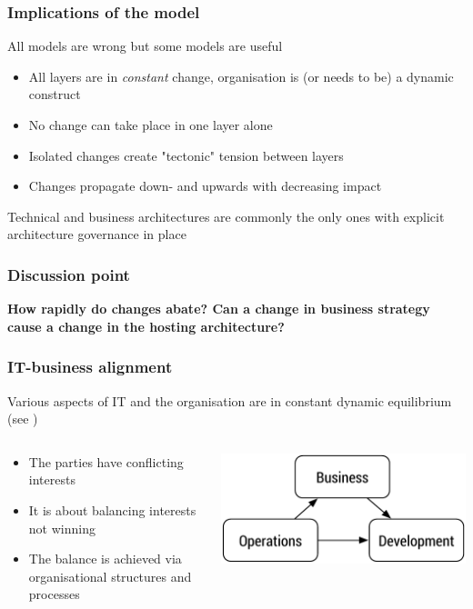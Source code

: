 \begin{frame}[fragile]
  \frametitle{Implications of the model}
  All models are wrong but some models are useful \citep{box1976science}
	\begin{itemize}
		\item All layers are in \emph{constant} change, organisation is (or needs to be) a dynamic construct
		\item No change can take place in one layer alone
		\item Isolated changes create "tectonic" tension between layers
		\item Changes propagate down- and upwards with decreasing impact
	\end{itemize}
	Technical and business architectures are commonly the only ones with explicit architecture governance in place
\end{frame}


\begin{frame}[fragile]
  \frametitle{Discussion point}
		\begin{center}
			\textbf{How rapidly do changes abate? Can a change in business strategy cause a change in the hosting architecture?}
		\end{center}
\end{frame}

\begin{frame}[fragile]
  \frametitle{IT-business alignment}
  Various aspects of IT and the organisation are in constant dynamic equilibrium (see \cite{luftman2004assessing})
	\begin{columns}[T]
		\begin{column}{7cm}
			\begin{itemize}
				\item The parties have conflicting interests
				\item It is about balancing interests not winning 
				\item The balance is achieved via organisational structures and processes
			\end{itemize}
		\end{column}
		\begin{column}[T]{5cm}
			\includegraphics[width=\textwidth]{alignment.pdf}
		\end{column}
	\end{columns}
\end{frame}

